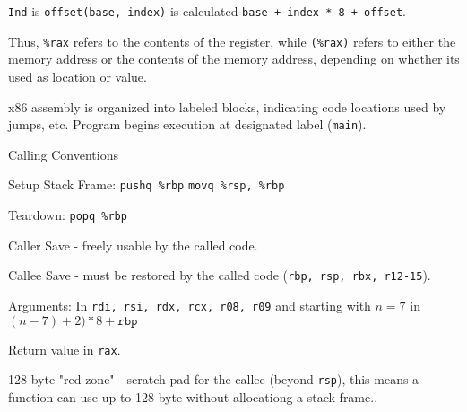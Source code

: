 \texttt{Ind} is  \texttt{offset(base, index)} is calculated \texttt{base + index * 8 + offset}.\medskip

Thus, \texttt{\%rax} refers to the contents of the register, while \texttt{(\%rax)} refers to either the memory address or the contents of the memory address, depending on whether its used as location or value.\medskip

x86 assembly is organized into labeled blocks, indicating code locations used by jumps, etc. Program begins execution at designated label (\texttt{main}).\medskip

Calling Conventions
\begin{compactitem}[$\quad\bullet$]
	\item Setup Stack Frame: \texttt{pushq \%rbp} \quad \texttt{movq \%rsp, \%rbp}

	\item Teardown: \texttt{popq \%rbp}

	\item Caller Save - freely usable by the called code.

	\item Callee Save - must be restored by the called code (\texttt{rbp, rsp, rbx, r12-15}).

	\item Arguments: In \texttt{rdi, rsi, rdx, rcx, r08, r09} and starting with $n = 7$ in $(n-7) + 2) * 8 + \texttt{rbp}$

	\item Return value in \texttt{rax}.

	\item 128 byte "red zone" - scratch pad for the callee (beyond \texttt{rsp}), this means a function can use up to 128 byte without allocationg a stack frame..
\end{compactitem}
